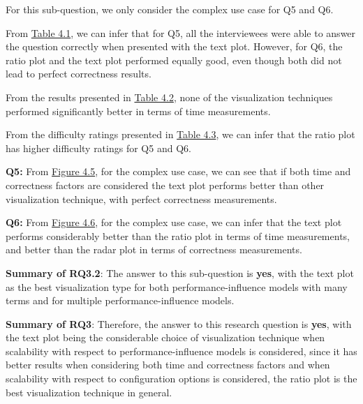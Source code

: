 For this sub-question, we only consider the complex use case for Q5 and Q6.

\begin{description}[leftmargin=0pt]
\item[Correctness: ] From \hyperref[table:correctness]{Table 4.1}, we can infer that for Q5, all the interviewees were able to answer the question correctly when presented with the text plot. However, for Q6, the ratio plot and the text plot performed equally good, even though both did not lead to perfect correctness results.

\item[Time Measurements: ] From the results presented in \hyperref[table:time]{Table 4.2}, none of the visualization techniques performed significantly better in terms of time measurements.

\item[Difficulty Ratings: ] From the difficulty ratings presented in \hyperref[table:rating]{Table 4.3}, we can infer that the ratio plot has higher difficulty ratings for Q5 and Q6.

\end{description}

\textbf{Q5:} From \hyperref[figure:paretoManyQ5]{Figure 4.5}, for the complex use case, we can see that if both time and correctness factors are considered the text plot performs better than other visualization technique, with perfect correctness measurements.

\textbf{Q6:} From \hyperref[figure:paretoManyQ6]{Figure 4.6}, for the complex use case, we can infer that the text plot performs considerably better than the ratio plot in terms of time measurements, and better than the radar plot in terms of correctness measurements.

\textbf{Summary of RQ3.2}: The answer to this sub-question is \textbf{yes}, with the text plot as the best visualization type for both performance-influence models with many terms and for multiple performance-influence models.

\textbf{Summary of RQ3}: Therefore, the answer to this research question is \textbf{yes}, with the text plot being the considerable choice of visualization technique when scalability with respect to performance-influence models is considered, since it has better results when considering both time and correctness factors and when scalability with respect to configuration options is considered, the ratio plot is the best visualization technique in general.


